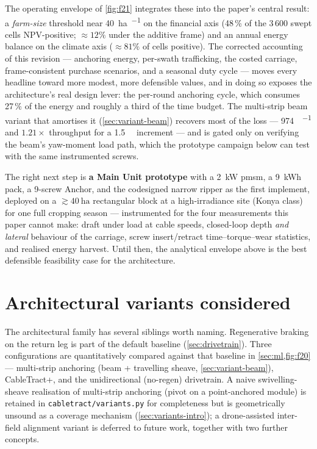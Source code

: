 \documentclass[11pt,a4paper]{article}
\begin{document}
The operating envelope of \cref{fig:f21} integrates these into the paper's central result: a \emph{farm-size} threshold near \SI{40}{\hectare\per\year} on the financial axis (48\,\% of the 3\,600 swept cells NPV-positive; ${\approx}12\%$ under the additive frame) and an annual energy balance on the climate axis (${\approx}81\%$ of cells positive). The corrected accounting of this revision --- anchoring energy, per-swath trafficking, the costed carriage, frame-consistent purchase scenarios, and a seasonal duty cycle --- moves every headline toward more modest, more defensible values, and in doing so exposes the architecture's real design lever: the per-round anchoring cycle, which consumes 27\,\% of the energy and roughly a third of the time budget. The multi-strip beam variant that amortises it (\cref{sec:variant-beam}) recovers most of the loss --- \SI{974}{\Wh\per\decare} and $1.21\times$ throughput for a \SI{1.5}{\kilo\EUR} increment --- and is gated only on verifying the beam's yaw-moment load path, which the prototype campaign below can test with the same instrumented screws.

The right next step is \textbf{a Main Unit prototype} with a \SI{2}{\kilo\watt} \gls{pmsm}, a \SI{9}{\kWh} pack, a 9-screw Anchor, and the codesigned narrow ripper as the first implement, deployed on a ${\gtrsim}\SI{40}{\hectare}$ rectangular block at a high-irradiance site (Konya class) for one full cropping season --- instrumented for the four measurements this paper cannot make: draft under load at cable speeds, closed-loop depth \emph{and lateral} behaviour of the carriage, screw insert/retract time--torque--wear statistics, and realised energy harvest. Until then, the analytical envelope above is the best defensible feasibility case for the architecture.

\appendix
\section{Architectural variants considered}\label{sec:variants-named}

The architectural family has several siblings worth naming. Regenerative braking on the return leg is part of the default baseline (\cref{sec:drivetrain}). Three configurations are quantitatively compared against that baseline in \cref{sec:ml,fig:f20} --- multi-strip anchoring (beam + travelling sheave, \cref{sec:variant-beam}), CableTract+, and the unidirectional (no-regen) drivetrain. A naive swivelling-sheave realisation of multi-strip anchoring (pivot on a point-anchored module) is retained in \texttt{cabletract/variants.py} for completeness but is geometrically unsound as a coverage mechanism (\cref{sec:variants-intro}); a drone-assisted inter-field alignment variant is deferred to future work, together with two further concepts.
\end{document}
